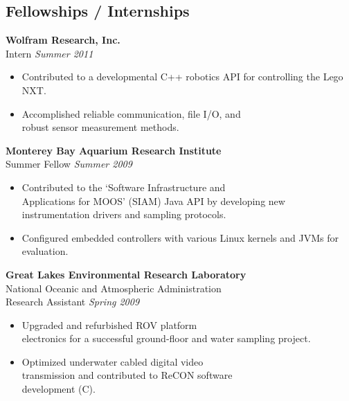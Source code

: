 \documentclass{article}
\begin{document}
{\begin{multicols}{2}
\section*{Fellowships / Internships}
\noindent
    \textbf{Wolfram Research, Inc. }\\
     Intern \hfill \textsl{Summer 2011} \\
    \vspace{ -10px}
    \begin{itemize}[noitemsep,nolistsep]
	\item Contributed to a developmental C++ robotics API for controlling the Lego NXT. 
	\item Accomplished reliable communication, file I/O, and \\robust sensor measurement methods. 
    \end{itemize}
    \vspace{5px}
    \textbf{Monterey Bay Aquarium Research Institute}\\
     Summer Fellow \hfill \textsl{Summer 2009}  \\
    \vspace{ -10px}	
    \begin{itemize}[noitemsep,nolistsep]
	\item Contributed to the `Software Infrastructure and \\Applications for MOOS' (SIAM) Java API by developing new instrumentation drivers and sampling protocols.
	\item Configured embedded controllers with various Linux kernels and JVMs for evaluation.
    \end{itemize}
    \vspace{5px}
    \textbf{Great Lakes Environmental Research Laboratory}\\
    National Oceanic and Atmospheric Administration\\
    Research Assistant \hfill \textsl{Spring 2009} \\
    \vspace{ -10px}
    \begin{itemize}[noitemsep,nolistsep]
	\item Upgraded and refurbished ROV platform \\electronics for a successful ground-floor and water sampling project.
	\item Optimized underwater cabled digital video \\transmission and contributed to ReCON software \\development (C).

\end{itemize}
\end{multicols}}
\end{document}

